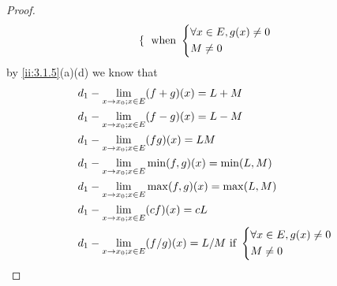 \begin{proof}
\begin{align*}
\begin{dcases}
                                                       \end{dcases} \text{ when } \begin{dcases}
                                                                                    \forall x \in E, g(x) \neq 0 \\
                                                                                    M \neq 0
                                                                                  \end{dcases}
  \end{align*}
  by \cref{ii:3.1.5}(a)(d) we know that
  \begin{align*}
     & d_1 - \lim_{x \to x_0 ; x \in E} (f + g)(x) = L + M                                          \\
     & d_1 - \lim_{x \to x_0 ; x \in E} (f - g)(x) = L - M                                          \\
     & d_1 - \lim_{x \to x_0 ; x \in E} (fg)(x) = LM                                                \\
     & d_1 - \lim_{x \to x_0 ; x \in E} \min(f, g)(x) = \min(L, M)                                  \\
     & d_1 - \lim_{x \to x_0 ; x \in E} \max(f, g)(x) = \max(L, M)                                  \\
     & d_1 - \lim_{x \to x_0 ; x \in E} (cf)(x) = cL                                                \\
     & d_1 - \lim_{x \to x_0 ; x \in E} (f / g)(x) = L / M \text{ if } \begin{dcases}
                                                                         \forall x \in E, g(x) \neq 0 \\
                                                                         M \neq 0
                                                                       \end{dcases}
  \end{align*}
\end{proof}
